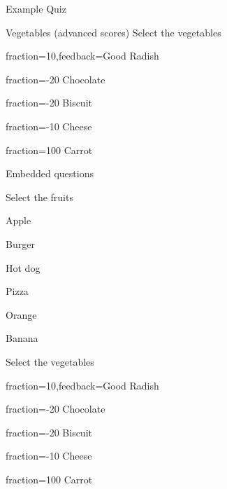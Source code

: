 \documentclass{article}
\begin{document}
\begin{quiz}[multiple]{Example Quiz}
\begin{multi}{Vegetables (advanced scores)}
Select the vegetables
\item[fraction=10,feedback={Good}] Radish%
\item[fraction=-20] Chocolate%
\item[fraction=-20] Biscuit%
\item[fraction=-10] Cheese%
\item[fraction=100] Carrot%
\end{multi}
\begin{cloze}{Embedded questions}
\begin{multi}%
Select the fruits
\item* Apple%
\item Burger%
\item Hot dog%
\item Pizza%
\item* Orange%
\item* Banana%
\end{multi}
\begin{multi}%
Select the vegetables
\item[fraction=10,feedback={Good}] Radish%
\item[fraction=-20] Chocolate%
\item[fraction=-20] Biscuit%
\item[fraction=-10] Cheese%
\item[fraction=100] Carrot%
\end{multi}
\end{cloze}
\end{quiz}
\end{document}
